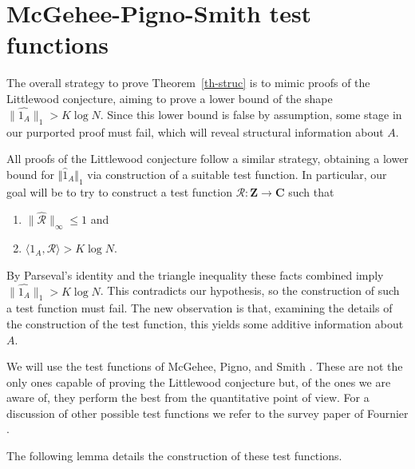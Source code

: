 \documentclass[reqno]{amsart}
\newcommand{\anorm}[1]{\| \widehat{#1}\|}
\renewcommand{\leq}{\leqslant}
\newcommand{\ri}{\mathcal{R}}
\newcommand{\ind}[1]{1_{#1}}
\newcommand{\bbz}{\mathbf{Z}}
\newcommand{\bbc}{\mathbf{C}}
\numberwithin{equation}{section}
\theoremstyle{definition}
\theoremstyle{remark}
\begin{document}
\section{McGehee-Pigno-Smith test functions}
The overall strategy to prove Theorem~\ref{th-struc} is to mimic proofs of the Littlewood conjecture, aiming to prove a lower bound of the shape $\anorm{1_A}_1>K\log N$. Since this lower bound is false by assumption, some stage in our purported proof must fail, which will reveal structural information about $A$.

All proofs of the Littlewood conjecture follow a similar strategy, obtaining a lower bound for $\Vert \widehat{1}_A \Vert_1$ via construction of a suitable test function. In particular, our goal will be to try to construct a test function $\ri:\bbz\to\bbc$ such that
\begin{enumerate}
\item $\|\widehat{\ri}\|_\infty \leq 1$ and
\item $\langle \ind{A},\ri\rangle > K\log N$.
\end{enumerate}
By Parseval's identity and the triangle inequality these facts combined imply $\anorm{\ind{A}}_1>K\log N$. This contradicts our hypothesis, so the construction of such a test function must fail. The new observation is that, examining the details of the construction of the test function, this yields some additive information about $A$.

We will use the test functions of McGehee, Pigno, and Smith \cite{MPS81}. These are not the only ones capable of proving the Littlewood conjecture but, of the ones we are aware of, they perform the best from the quantitative point of view. For a discussion of other possible test functions we refer to the survey paper of Fournier \cite{Fo83}. 

The following lemma details the construction of these test functions.
\end{document}
